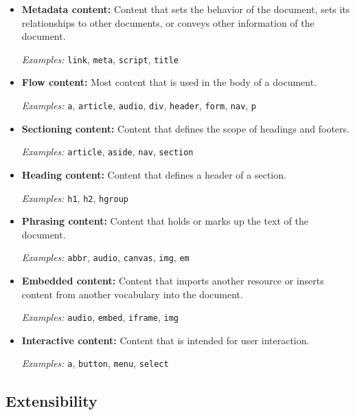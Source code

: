 \begin{itemize}
\item \textbf{Metadata content:} Content that sets the behavior of the
  document, sets its relationships to other documents, or conveys
  other information of the document.

  \textit{Examples:} \texttt{link}, \texttt{meta}, \texttt{script},
  \texttt{title}

\item \textbf{Flow content:} Most content that is used in the body of
  a document.

  \textit{Examples:} \texttt{a}, \texttt{article}, \texttt{audio},
  \texttt{div}, \texttt{header}, \texttt{form}, \texttt{nav},
  \texttt{p}

\item \textbf{Sectioning content:} Content that defines the scope of
  headings and footers.

  \textit{Examples:} \texttt{article}, \texttt{aside}, \texttt{nav},
  \texttt{section}

\item \textbf{Heading content:} Content that defines a header of a
  section.

  \textit{Examples:} \texttt{h1}, \texttt{h2}, \texttt{hgroup}

\item \textbf{Phrasing content:} Content that holds or marks up the
  text of the document.

  \textit{Examples:} \texttt{abbr}, \texttt{audio}, \texttt{canvas},
  \texttt{img}, \texttt{em}

\item \textbf{Embedded content:} Content that imports another resource
  or inserts content from another vocabulary into the document.

  \textit{Examples:} \texttt{audio}, \texttt{embed}, \texttt{iframe},
  \texttt{img}

\item \textbf{Interactive content:} Content that is intended for user
  interaction.

  \textit{Examples:} \texttt{a}, \texttt{button}, \texttt{menu},
  \texttt{select}

\end{itemize}

\subsection{Extensibility}

